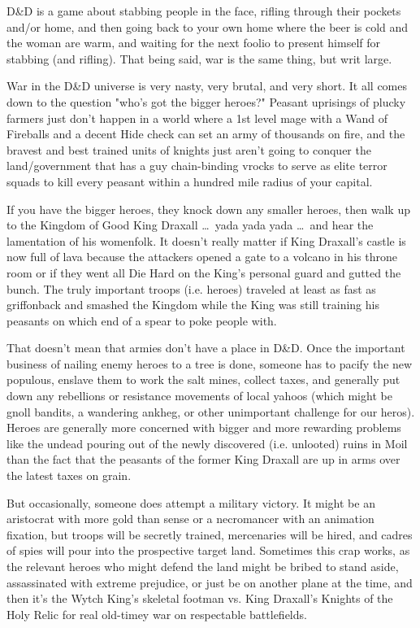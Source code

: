 D\&D is a game about stabbing people in the face, rifling through their pockets and/or home, and then going back to your own home where the beer is cold and the woman are warm, and waiting for the next foolio to present himself for stabbing (and rifling). That being said, war is the same thing, but writ large.

War in the D\&D universe is very nasty, very brutal, and very short. It all comes down to the question "who's got the bigger heroes?" Peasant uprisings of plucky farmers just don't happen in a world where a 1st level mage with a Wand of Fireballs and a decent Hide check can set an army of thousands on fire, and the bravest and best trained units of knights just aren't going to conquer the land/government that has a guy chain-binding vrocks to serve as elite terror squads to kill every peasant within a hundred mile radius of your capital.

If you have the bigger heroes, they knock down any smaller heroes, then walk up to the Kingdom of Good King Draxall  \ldots\  yada yada yada \ldots\ and hear the lamentation of his womenfolk. It doesn't really matter if King Draxall's castle is now full of lava because the attackers opened a gate to a volcano in his throne room or if they went all Die Hard on the King's personal guard and gutted the bunch. The truly important troops (i.e. heroes) traveled at least as fast as griffonback and smashed the Kingdom while the King was still training his peasants on which end of a spear to poke people with.

That doesn't mean that armies don't have a place in D\&D. Once the important business of nailing enemy heroes to a tree is done, someone has to pacify the new populous, enslave them to work the salt mines, collect taxes, and generally put down any rebellions or resistance movements of local yahoos (which might be gnoll bandits, a wandering ankheg, or other unimportant challenge for our heros). Heroes are generally more concerned with bigger and more rewarding problems like the undead pouring out of the newly discovered (i.e. unlooted) ruins in Moil than the fact that the peasants of the former King Draxall are up in arms over the latest taxes on grain.

But occasionally, someone does attempt a military victory. It might be an aristocrat with more gold than sense or a necromancer with an animation fixation, but troops will be secretly trained, mercenaries will be hired, and cadres of spies will pour into the prospective target land. Sometimes this crap works, as the relevant heroes who might defend the land might be bribed to stand aside, assassinated with extreme prejudice, or just be on another plane at the time, and then it's the Wytch King's skeletal footman vs. King Draxall's Knights of the Holy Relic for real old-timey war on respectable battlefields.

